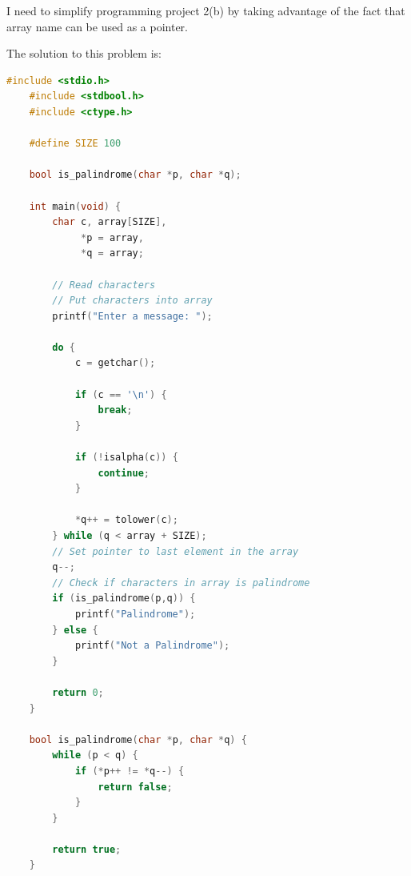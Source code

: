 \documentclass[12pt]{article}
\begin{document}
\begin{enumerate}[1.]
    I need to simplify programming project 2(b) by taking advantage of the fact that
    array name can be used as a pointer.

    \bigskip

    The solution to this problem is:

    \bigskip

\begin{lstlisting}[language=c]
    #include <stdio.h>
    #include <stdbool.h>
    #include <ctype.h>

    #define SIZE 100

    bool is_palindrome(char *p, char *q);

    int main(void) {
        char c, array[SIZE],
             *p = array,
             *q = array;

        // Read characters
        // Put characters into array
        printf("Enter a message: ");

        do {
            c = getchar();

            if (c == '\n') {
                break;
            }

            if (!isalpha(c)) {
                continue;
            }

            *q++ = tolower(c);
        } while (q < array + SIZE);
        // Set pointer to last element in the array
        q--;
        // Check if characters in array is palindrome
        if (is_palindrome(p,q)) {
            printf("Palindrome");
        } else {
            printf("Not a Palindrome");
        }

        return 0;
    }

    bool is_palindrome(char *p, char *q) {
        while (p < q) {
            if (*p++ != *q--) {
                return false;
            }
        }

        return true;
    }
\end{lstlisting}

\end{enumerate}
\end{document}
